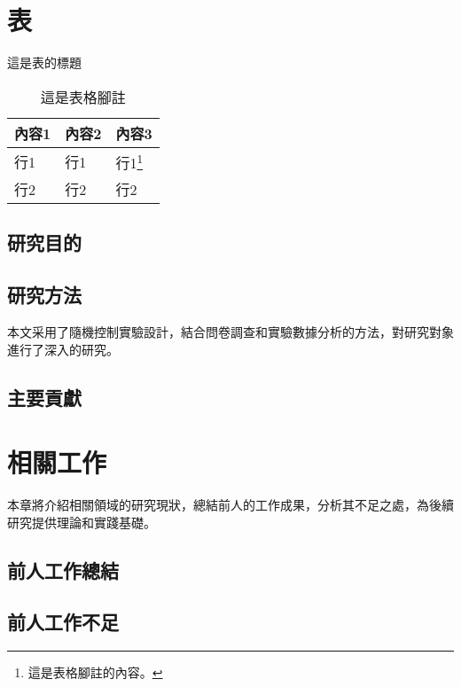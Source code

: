 \documentclass[writingLanguage=chinese,
    addPageTitle=on,
    addDeclaration=on,
    addMUSTlog=off,
    addFigTOC=on,   
    addTabTOC=on,
    refIndent=on,
    printMod=off,
]{.def/must}
\begin{document}
\section{表}

\begin{table}
\caption{這是表的標題}
\centering
\begin{tabularx}{\textwidth}{XXX} %
\toprule
內容1 & 內容2 & 內容3 \\
\midrule
行1 & 行1 & 行1\footnote{這是表格腳註的內容。} \\
行2 & 行2 & 行2 \\
\bottomrule
\end{tabularx}
\caption*{這是表格腳註}
\end{table}





\subsection{研究目的}

\txtHere{[1]}

\subsection{研究方法}

本文采用了隨機控制實驗設計，結合問卷調查和實驗數據分析的方法，對研究對象進行了深入的研究。

\subsection{主要貢獻}

\txtHere{[1]}

\section{相關工作}

本章將介紹相關領域的研究現狀，總結前人的工作成果，分析其不足之處，為後續研究提供理論和實踐基礎。

\subsection{前人工作總結}

\txtHere{[1]}

\subsection{前人工作不足}
\end{document}
